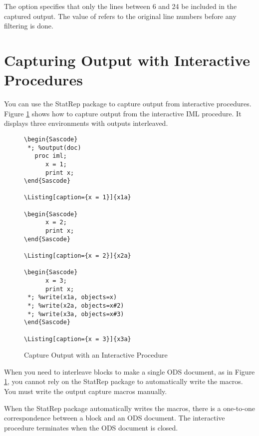\documentclass[article,oneside]{memoir}
\newcommand*{\StatRep}{\textsf{StatRep}\xspace}
\begin{document}
  The  option specifies that only the lines between 6 and 24
  be included in the captured output.
  The value of  refers to the original line numbers before any filtering is done. 
  
  
\section{Capturing Output with Interactive Procedures}
  You can use the \StatRep package to capture output from interactive procedures.
Figure \ref{interact} shows how to capture output from the interactive
  IML procedure.  It displays three  environments with 
  outputs interleaved.
  
\begin{figure}[H]
\begin{snugshade}
\begin{verbatim}  
\begin{Sascode}
 *; %output(doc)
   proc iml;
      x = 1; 
      print x;
\end{Sascode}

\Listing[caption={x = 1}]{x1a}

\begin{Sascode}
      x = 2; 
      print x;
\end{Sascode}

\Listing[caption={x = 2}]{x2a}

\begin{Sascode}
      x = 3; 
      print x;
 *; %write(x1a, objects=x)
 *; %write(x2a, objects=x#2)
 *; %write(x3a, objects=x#3)
\end{Sascode}

\Listing[caption={x = 3}]{x3a}
\end{verbatim}
\end{snugshade}
\caption{Capture Output with an Interactive Procedure}\label{interact}
\end{figure}

  When you need to interleave  blocks to make a single ODS 
  document, as in Figure \ref{interact}, you cannot rely on the \StatRep package to
  automatically write the macros. You must write the output capture macros manually.
   
  When the \StatRep package automatically writes the macros, there is a 
  one-to-one correspondence between a  block and an ODS document.
  The interactive procedure terminates when the ODS document is closed. 
  
\end{document}
